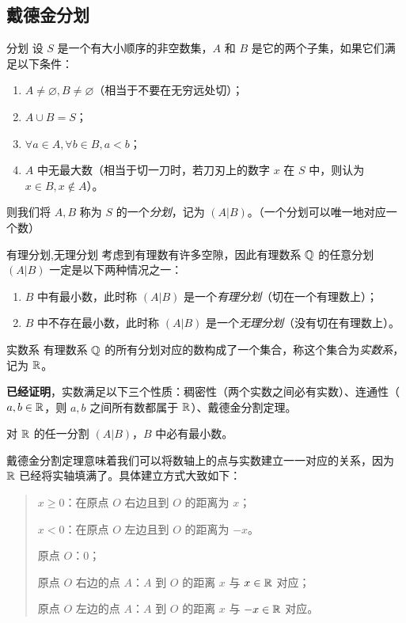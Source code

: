 \subsection{戴德金分划}

\begin{definition}{分划}
	设 $S$ 是一个有大小顺序的非空数集，$A$ 和 $B$ 是它的两个子集，如果它们满足以下条件：
	\begin{enumerate}
		\item $A \ne \varnothing, B \ne \varnothing$（相当于不要在无穷远处切）；
		\item $A \cup B = S$；
		\item $\forall a \in A, \forall b \in B, a < b$；
		\item $A$ 中无最大数（相当于切一刀时，若刀刃上的数字 $x$ 在 $S$ 中，则认为 $x \in B, x \not \in A$）。
	\end{enumerate}
	则我们将 $A, B$ 称为 $S$ 的一个\emph{分划}，记为 $(A | B)$。（一个分划可以唯一地对应一个数）
\end{definition}

\begin{definition}{有理分划,无理分划}
	考虑到有理数有许多空隙，因此有理数系 $\mathbb Q$ 的任意分划 $(A | B)$ 一定是以下两种情况之一：
	\begin{enumerate}
		\item $B$ 中有最小数，此时称 $(A | B)$ 是一个\emph{有理分划}（切在一个有理数上）；
		\item $B$ 中不存在最小数，此时称 $(A | B)$ 是一个\emph{无理分划}（没有切在有理数上）。
	\end{enumerate}
\end{definition}

\begin{definition}{实数系}
	有理数系 $\mathbb Q$ 的所有分划对应的数构成了一个集合，称这个集合为\emph{实数系}，记为 $\mathbb R$。
\end{definition}

\textbf{已经证明}，实数满足以下三个性质：稠密性（两个实数之间必有实数）、连通性（$a, b \in \mathbb R$，则 $a, b$ 之间所有数都属于 $\mathbb R$）、戴德金分割定理。

\begin{theorem}[戴德金分割定理]
	对 $\mathbb R$ 的任一分割 $(A | B)$，$B$ 中必有最小数。
\end{theorem}

戴德金分割定理意味着我们可以将数轴上的点与实数建立一一对应的关系，因为 $\mathbb R$ 已经将实轴填满了。具体建立方式大致如下：

\begin{quotation}
	$x \ge 0$：在原点 $O$ 右边且到 $O$ 的距离为 $x$；

	$x < 0$：在原点 $O$ 左边且到 $O$ 的距离为 $-x$。

	\bigskip

	原点 $O$：$0$；

	原点 $O$ 右边的点 $A$：$A$ 到 $O$ 的距离 $x$ 与 $x \in \mathbb R$ 对应；

	原点 $O$ 左边的点 $A$：$A$ 到 $O$ 的距离 $x$ 与 $-x \in \mathbb R$ 对应。
\end{quotation}

